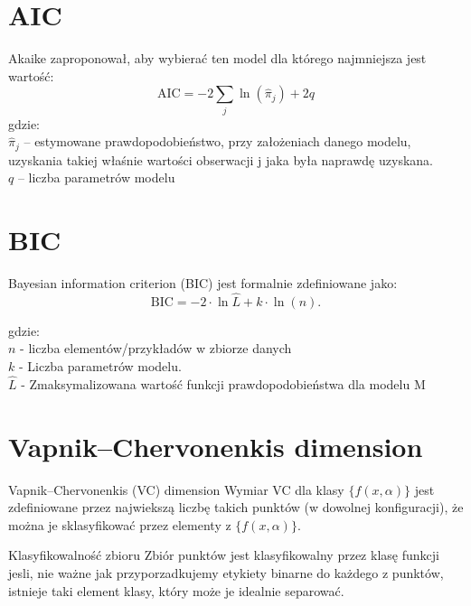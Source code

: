 \documentclass[a4paper]{beamer}
\begin{document}
\section{AIC}
\begin{frame}
Akaike zaproponował, aby wybierać ten model dla którego najmniejsza jest wartość:
$$\mathrm{AIC}=-2\sum\limits_{j}\ln(\hat{\pi}_j)+2q$$
gdzie: \\
$\hat{\pi}_j$ – estymowane prawdopodobieństwo, przy założeniach danego modelu, uzyskania takiej właśnie wartości obserwacji j jaka była naprawdę uzyskana.\\
$q$ – liczba parametrów modelu
\end{frame}

\section{BIC}
\begin{frame}
Bayesian information criterion (BIC) jest formalnie zdefiniowane jako:
$$\mathrm{BIC} = {-2 \cdot \ln{\hat L} + k \cdot \ln(n)}.$$

gdzie: \\

    $n$ - liczba elementów/przykładów w zbiorze danych \\
    $k$ - Liczba parametrów modelu. \\
    $\hat L$ - Zmaksymalizowana wartość funkcji prawdopodobieństwa dla modelu M

\end{frame}

\section{Vapnik–Chervonenkis dimension}
\begin{frame}
\begin{block}{Vapnik–Chervonenkis (VC) dimension}
Wymiar VC dla klasy $\{f(x, \alpha )\}$ jest zdefiniowane przez najwiekszą liczbę takich punktów (w dowolnej konfiguracji), że można je sklasyfikować przez elementy z $\{f(x, \alpha)\}$.
\end{block}
\begin{block}{Klasyfikowalność zbioru}
Zbiór punktów jest klasyfikowalny przez klasę funkcji jesli, nie ważne jak przyporzadkujemy etykiety binarne do każdego z punktów, istnieje taki element klasy, który może je idealnie separować.
\end{block}
\end{frame}
\end{document}

